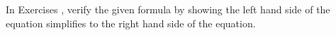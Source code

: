 {\noindent In Exercises}
{, verify the given formula by showing the left hand side of the equation simplifies to the right hand side of the equation.}


